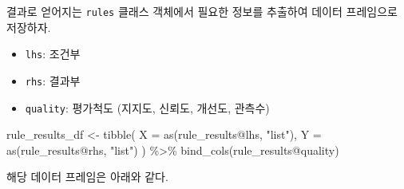 \documentclass[
]{book}
\newenvironment{Shaded}{\begin{snugshade}}{\end{snugshade}}
\newcommand{\AttributeTok}[1]{\textcolor[rgb]{0.77,0.63,0.00}{#1}}
\newcommand{\FunctionTok}[1]{\textcolor[rgb]{0.00,0.00,0.00}{#1}}
\newcommand{\NormalTok}[1]{#1}
\newcommand{\OtherTok}[1]{\textcolor[rgb]{0.56,0.35,0.01}{#1}}
\newcommand{\SpecialCharTok}[1]{\textcolor[rgb]{0.00,0.00,0.00}{#1}}
\newcommand{\StringTok}[1]{\textcolor[rgb]{0.31,0.60,0.02}{#1}}
\providecommand{\tightlist}{%
  \setlength{\itemsep}{0pt}\setlength{\parskip}{0pt}}
\begin{document}
결과로 얻어지는 \texttt{rules} 클래스 객체에서 필요한 정보를 추출하여 데이터 프레임으로 저장하자.

\begin{itemize}
\tightlist
\item
  \texttt{lhs}: 조건부
\item
  \texttt{rhs}: 결과부
\item
  \texttt{quality}: 평가척도 (지지도, 신뢰도, 개선도, 관측수)
\end{itemize}

\begin{Shaded}
\begin{Highlighting}[]
\NormalTok{rule\_results\_df }\OtherTok{\textless{}{-}} \FunctionTok{tibble}\NormalTok{(}
  \AttributeTok{X =} \FunctionTok{as}\NormalTok{(rule\_results}\SpecialCharTok{@}\NormalTok{lhs, }\StringTok{"list"}\NormalTok{),}
  \AttributeTok{Y =} \FunctionTok{as}\NormalTok{(rule\_results}\SpecialCharTok{@}\NormalTok{rhs, }\StringTok{"list"}\NormalTok{)}
\NormalTok{) }\SpecialCharTok{\%\textgreater{}\%}
  \FunctionTok{bind\_cols}\NormalTok{(rule\_results}\SpecialCharTok{@}\NormalTok{quality)}
\end{Highlighting}
\end{Shaded}

해당 데이터 프레임은 아래와 같다.
\end{document}
